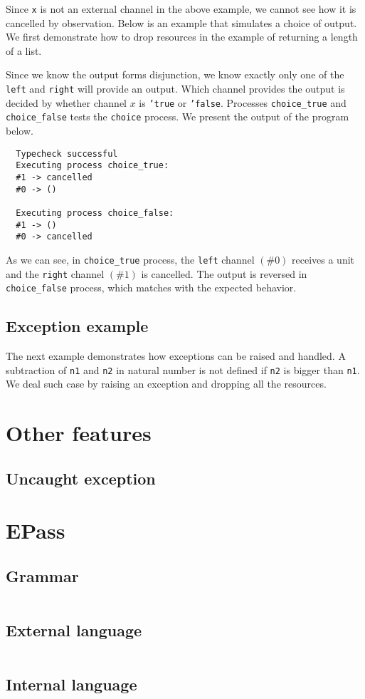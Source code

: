 \documentclass[12pt, openany]{memoir}
\begin{document}
Since \texttt{x} is not an external channel in the above example, we cannot see how it is cancelled by observation.
Below is an example that simulates a choice of output. 
We first demonstrate how to drop resources in the example of returning a length of a list.

Since we know the output forms disjunction, we know exactly only one of the \texttt{left} and \texttt{right}
will provide an output. 
Which channel provides the output is decided by whether channel $x$ is \texttt{'true} or \texttt{'false}.
Processes \texttt{choice\_true} and \texttt{choice\_false} tests the \texttt{choice} process.
We present the output of the program below.
\begin{verbatim}
  Typecheck successful                  
  Executing process choice_true:
  #1 -> cancelled
  #0 -> ()

  Executing process choice_false:
  #1 -> ()
  #0 -> cancelled
\end{verbatim}
As we can see, in \texttt{choice\_true} process, the \texttt{left} channel $(\# 0)$ receives a unit and the \texttt{right} channel $(\# 1)$ is cancelled.
The output is reversed in \texttt{choice\_false} process, which matches with the expected behavior.
\section{Exception example}
The next example demonstrates how exceptions can be raised and handled. 
A subtraction of \texttt{n1} and \texttt{n2} in natural number is not defined if 
\texttt{n2} is bigger than \texttt{n1}. We deal such case by raising an exception and dropping all the resources.


\chapter{Other features}
\section{Uncaught exception}
\appendix
\chapter{EPass} 
\section{Grammar} \label{sec:grammar}
\inputminted{text}{code/grammar.txt}
\section{External language} \label{sec:el}
\inputminted{ocaml}{code/el.ml}
\section{Internal language} \label{sec:il}
\inputminted{ocaml}{code/il.ml}
\backmatter

\printbibliography
\end{document}
